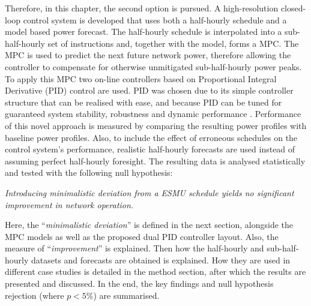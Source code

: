 Therefore, in this chapter, the second option is pursued.
A high-resolution closed-loop control system is developed that uses both a half-hourly schedule and a model based power forecast.
The half-hourly schedule is interpolated into a sub-half-hourly set of instructions and, together with the model, forms a MPC.
The MPC is used to predict the next future network power, therefore allowing the controller to compensate for otherwise unmitigated sub-half-hourly power peaks.
To apply this MPC two on-line controllers based on Proportional Integral Derivative (PID) control are used.
PID was chosen due to its simple controller structure that can be realised with ease, and because PID can be tuned for guaranteed system stability, robustness and dynamic performance \cite{Rasoanarivo2013, Jianbo2007, Betin2006, Algaddafi2016}.
Performance of this novel approach is measured by comparing the resulting power profiles with baseline power profiles.
Also, to include the effect of erroneous schedules on the control system's performance, realistic half-hourly forecasts are used instead of assuming perfect half-hourly foresight.
The resulting data is analysed statistically and tested with the following null hypothesis:

\textit{Introducing minimalistic deviation from a ESMU schedule yields no significant improvement in network operation.}

Here, the ``\textit{minimalistic deviation}'' is defined in the next section, alongside the MPC models as well as the proposed dual PID controller layout.
Also, the measure of ``\textit{improvement}'' is explained.
Then how the half-hourly and sub-half-hourly datasets and forecasts are obtained is explained.
How they are used in different case studies is detailed in the method section, after which the results are presented and discussed.
In the end, the key findings and null hypothesis rejection (where $p<5\%$) are summarised.
